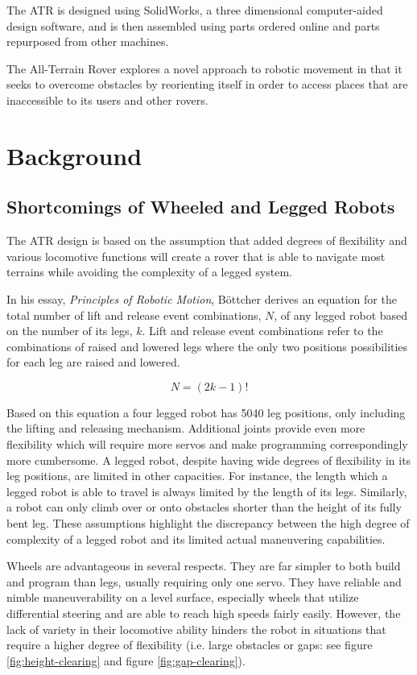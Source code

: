 \documentclass[11pt]{article}
\numberwithin{figure}{section}
\begin{document}
\begin{multicols}{2}
The ATR is designed using SolidWorks, a three dimensional computer-aided design software, and is then assembled using parts ordered online and parts repurposed from other machines.

The All-Terrain Rover explores a novel approach to robotic movement in that it seeks to overcome obstacles by reorienting itself in order to access places that are inaccessible to its users and other rovers.
\section{Background}
\subsection{Shortcomings of Wheeled and Legged Robots}
The ATR design is based on the assumption that added degrees of flexibility and various locomotive functions will create a rover that is able to navigate most terrains while avoiding the complexity of a legged system.

In his essay, \textit{Principles of Robotic Motion}, Böttcher derives an equation for the total number of lift and release event combinations, $N$, of any legged robot based on the number of its legs, $k$. Lift and release event combinations refer to the combinations of raised and lowered legs where the only two positions possibilities for each leg are raised and lowered. 

\begin{equation}
N= (2k-1)!
\end{equation}

Based on this equation a four legged robot has 5040 leg positions, only including the lifting and releasing mechanism. Additional joints provide even more flexibility which will require more servos and make programming correspondingly more cumbersome. A legged robot, despite having wide degrees of flexibility in its leg positions, are limited in other capacities. For instance, the length which a legged robot is able to travel is always limited by the length of its legs. Similarly, a robot can only climb over or onto obstacles shorter than the height of its fully bent leg. These assumptions highlight the discrepancy between the high degree of complexity of a legged robot and its limited actual maneuvering capabilities.

Wheels are advantageous in several respects. They are far simpler to both build and program than legs, usually requiring only one servo. They have reliable and nimble maneuverability on a level surface, especially wheels that utilize differential steering and are able to reach high speeds fairly easily.  However, the lack of variety in their locomotive ability hinders the robot in situations that require a higher degree of flexibility (i.e. large obstacles or gaps: see figure \ref{fig:height-clearing} and figure \ref{fig:gap-clearing}).


\end{multicols}
\end{document}
